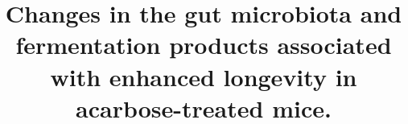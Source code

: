 \documentclass{doc/template/bmcart-nofigbox}
\begin{document}
\begin{frontmatter}

\begin{fmbox}


\title{Changes in the gut microbiota and fermentation products
       associated with enhanced longevity in acarbose-treated mice.}



\author[
   addressref={um1},                   %
   email={bjsm@umich.edu}   %
]{ }
\author[
   addressref={um2},                   %
]{ }
\author[
   addressref={umo},                   %
]{ }
\author[
   addressref={jl},                   %
]{ }
\author[
   addressref={ut1,ut2,ut3},                   %
]{ }
\author[
   addressref={um1,um3},                   %
   corref={um3},                       %
   email={schmidti@umich.edu}   %
]{ }


\end{fmbox}
\end{frontmatter}
\end{document}
